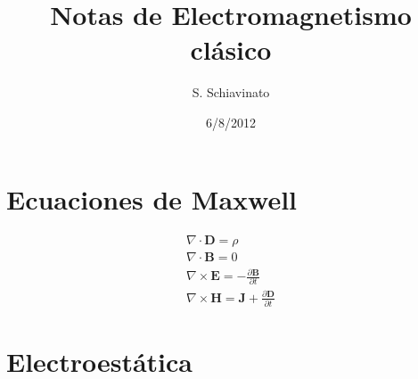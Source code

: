 \documentclass[11pt,a4paper]{article}
\title{Notas de Electromagnetismo clásico}
\author{S. Schiavinato}
\date{6/8/2012}
\numberwithin{equation}{section}
\begin{document}
\maketitle
\tableofcontents

\section{Ecuaciones de Maxwell}

\begin{align}
    \nabla \cdot \textbf{D} = \rho\\
    \nabla \cdot \textbf{B} = 0\\
    \nabla \times \textbf{E} = -\frac{\partial \textbf{B}}{\partial t}\\
    \nabla \times \textbf{H} = \textbf{J} + \frac{\partial \textbf{D}}{\partial t}
    \label{eq:em_maxwell}
\end{align}


\section{Electroestática}
\end{document}
